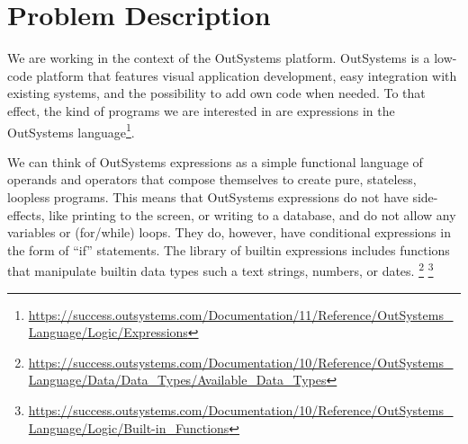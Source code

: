\section{Problem Description}
\label{sec:problem-description}

We are working in the context of the OutSystems platform. OutSystems is a
low-code platform that features visual application development, easy integration
with existing systems, and the possibility to add own code when needed. To that
effect, the kind of programs we are interested in are expressions in the
OutSystems language\footnote{\url{https://success.outsystems.com/Documentation/11/Reference/OutSystems_Language/Logic/Expressions}}.

We can think of OutSystems expressions as a simple functional language of
operands and operators that compose themselves to create pure, stateless,
loopless programs. This means that OutSystems expressions do not have
side-effects, like printing to the screen, or writing to a database, and do not
allow any variables or (for/while) loops. They do, however, have conditional
expressions in the form of ``if'' statements. The library of builtin expressions
includes functions that manipulate builtin data types such a text strings,
numbers, or dates.%
\footnote{\url{https://success.outsystems.com/Documentation/10/Reference/OutSystems_Language/Data/Data_Types/Available_Data_Types}}%
\footnote{\url{https://success.outsystems.com/Documentation/10/Reference/OutSystems_Language/Logic/Built-in_Functions}}

